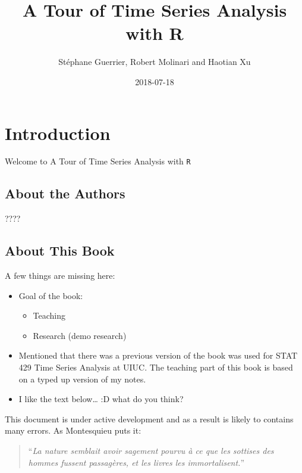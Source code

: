 \documentclass[]{book}
\title{A Tour of Time Series Analysis with R}
\author{Stéphane Guerrier, Robert Molinari and Haotian Xu}
\date{2018-07-18}
\providecommand{\tightlist}{%
  \setlength{\itemsep}{0pt}\setlength{\parskip}{0pt}}
\theoremstyle{definition}
\theoremstyle{definition}
\theoremstyle{definition}
\theoremstyle{remark}
\begin{document}
\maketitle

{
\setcounter{tocdepth}{1}
\tableofcontents
}
\hypertarget{introduction}{%
\chapter{Introduction}\label{introduction}}

Welcome to A Tour of Time Series Analysis with \texttt{R}

\hypertarget{about-the-authors}{%
\section{About the Authors}\label{about-the-authors}}

????

\hypertarget{about-this-book}{%
\section{About This Book}\label{about-this-book}}

\begin{rmdcomment}
A few things are missing here:

\begin{itemize}
\tightlist
\item
  Goal of the book:

  \begin{itemize}
  \tightlist
  \item
    Teaching
  \item
    Research (demo research)
  \end{itemize}
\item
  Mentioned that there was a previous version of the book was used for
  STAT 429 Time Series Analysis at UIUC. The teaching part of this book
  is based on a typed up version of my notes.
\item
  I like the text below\ldots{} :D what do you think?
\end{itemize}
\end{rmdcomment}

This document is under active development and as a result is likely to
contains many errors. As Montesquieu puts it:

\begin{quote}
``\emph{La nature semblait avoir sagement pourvu à ce que les sottises
des hommes fussent passagères, et les livres les immortalisent.}''
\end{quote}
\end{document}
